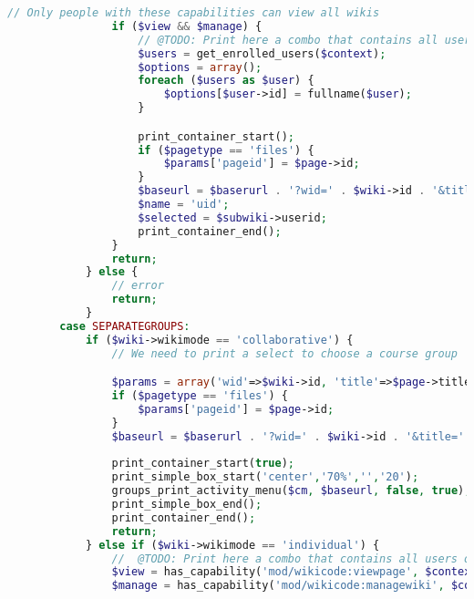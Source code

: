 \begin{lstlisting}[language=PHP]
                // Only people with these capabilities can view all wikis
                if ($view && $manage) {
                    // @TODO: Print here a combo that contains all users.
                    $users = get_enrolled_users($context);
                    $options = array();
                    foreach ($users as $user) {
                        $options[$user->id] = fullname($user);
                    }

                    print_container_start();
                    if ($pagetype == 'files') {
                        $params['pageid'] = $page->id;
                    }
                    $baseurl = $baserurl . '?wid=' . $wiki->id . '&title=' . $page->title;
                    $name = 'uid';
                    $selected = $subwiki->userid;
                    print_container_end();
                }
                return;
            } else {
                // error
                return;
            }
        case SEPARATEGROUPS:
            if ($wiki->wikimode == 'collaborative') {
                // We need to print a select to choose a course group

                $params = array('wid'=>$wiki->id, 'title'=>$page->title);
                if ($pagetype == 'files') {
                    $params['pageid'] = $page->id;
                }
                $baseurl = $baserurl . '?wid=' . $wiki->id . '&title=' . $page->title;
				
                print_container_start(true);
				print_simple_box_start('center','70%','','20');
                groups_print_activity_menu($cm, $baseurl, false, true);
				print_simple_box_end();
                print_container_end();
                return;
            } else if ($wiki->wikimode == 'individual') {
                //  @TODO: Print here a combo that contains all users of that subwiki.
                $view = has_capability('mod/wikicode:viewpage', $context);
                $manage = has_capability('mod/wikicode:managewiki', $context);


\end{lstlisting}
